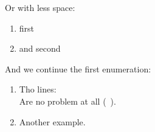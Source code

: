 Or with less space:
\begin{enumerate}[noitemsep]
    \item first
    \item and second
\end{enumerate}

And we continue the first enumeration:
\begin{enumerate}[basicreq]
\item \label{req:example3}
Tho lines:\\
Are no problem at all (\vgl~\cite{AllegroSoft:2011}).
\item \label{req:example4}
Another example.
\end{enumerate}
